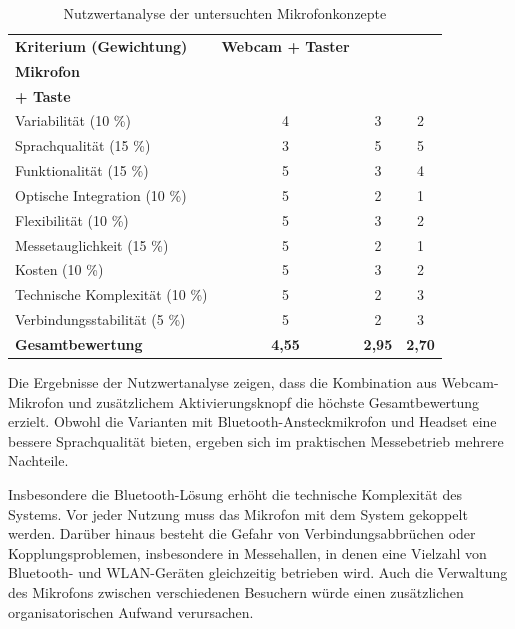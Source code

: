\begin{table}[H]
	\centering

	\begin{tabular}{|p{5.5cm}|c|c|c|}
		\hline
		\textbf{Kriterium (Gewichtung)} &
		\textbf{Webcam + Taster} &
		\shortstack{\textbf{Bluetooth-}\\\textbf{Mikrofon}} &
		\shortstack{\textbf{Headset}\\\textbf{+ Taste}} \\
		\hline
		Variabilität (10 \%) & 4 & 3 & 2 \\
		Sprachqualität (15 \%) & 3 & 5 & 5 \\
		Funktionalität (15 \%) & 5 & 3 & 4 \\
		Optische Integration (10 \%) & 5 & 2 & 1 \\
		Flexibilität (10 \%) & 5 & 3 & 2 \\
		Messetauglichkeit (15 \%) & 5 & 2 & 1 \\
		Kosten (10 \%) & 5 & 3 & 2 \\
		Technische Komplexität (10 \%) & 5 & 2 & 3 \\
		Verbindungsstabilität (5 \%) & 5 & 2 & 3 \\
		\hline
		\textbf{Gesamtbewertung} & \textbf{4,55} & \textbf{2,95} & \textbf{2,70} \\
		\hline
	\end{tabular}
		\caption{Nutzwertanalyse der untersuchten Mikrofonkonzepte}
	\label{tab:mikrofonbewertung}
	\renewcommand{\arraystretch}{1.2}
\end{table}


Die Ergebnisse der Nutzwertanalyse zeigen, dass die Kombination aus Webcam-Mikrofon und zusätzlichem Aktivierungsknopf die höchste Gesamtbewertung erzielt. Obwohl die Varianten mit Bluetooth-Ansteckmikrofon und Headset eine bessere Sprachqualität bieten, ergeben sich im praktischen Messebetrieb mehrere Nachteile.

Insbesondere die Bluetooth-Lösung erhöht die technische Komplexität des Systems. Vor jeder Nutzung muss das Mikrofon mit dem System gekoppelt werden. Darüber hinaus besteht die Gefahr von Verbindungsabbrüchen oder Kopplungsproblemen, insbesondere in Messehallen, in denen eine Vielzahl von Bluetooth- und WLAN-Geräten gleichzeitig betrieben wird. Auch die Verwaltung des Mikrofons zwischen verschiedenen Besuchern würde einen zusätzlichen organisatorischen Aufwand verursachen.

